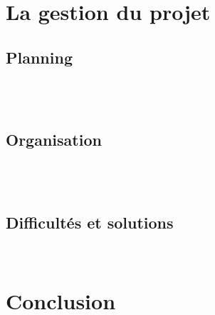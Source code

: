 \documentclass[a4paper,11pt]{article}
\begin{document}
	
		   
	
~\\
~\\
\section{ La gestion du projet  }


	    \subsection{ Planning }
	    
	    
	    
	    ~\\
	    ~\\	    
	    \subsection{ Organisation }
	    
	    
	    ~\\
	    ~\\	    
	    \subsection{ Difficultés et solutions} \label{ret}
	    
	    
	    
	    
	    ~\\
	     
			    
\section{ Conclusion }




		   
		   
\appendix %
		   

		   
\newpage		   
~\\ 		   			    
\end{document}
